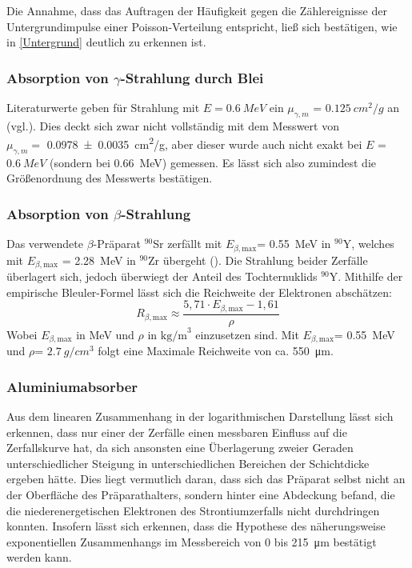 \documentclass[
	a4paper,
	12pt,
	pagesize,
	ngerman
]{scrartcl}
\begin{document}
	Die Annahme, dass das Auftragen der Häufigkeit gegen die Zählereignisse der Untergrundimpulse einer Poisson-Verteilung entspricht, ließ sich bestätigen, wie in \cref{Untergrund} deutlich zu erkennen ist.
	
	\subsubsection{Absorption von $\gamma$-Strahlung durch Blei}
	Literaturwerte geben für Strahlung mit $E=\SI{0,6}{MeV}$ ein $\mu_{\gamma,m}$ = $\SI{0,125}{cm^2/g}$ an (vgl.\cite{absorption_blei}).
	Dies deckt sich zwar nicht vollständig mit dem Messwert von \\
	$\mu_{\gamma,m} = $ \SI{0,0978 \pm 0,0035}{cm^2/g}, 
	aber dieser wurde auch nicht exakt bei $E$ = $\SI{0,6}{MeV}$ (sondern bei \SI{0,66}{MeV}) gemessen.
	Es lässt sich also zumindest die Größenordnung des Messwerts bestätigen.
	
	\subsubsection{Absorption von $\beta$-Strahlung}
	Das verwendete $\beta$-Präparat $^{90}$Sr zerfällt mit $E_{\beta,\text{max}}$= \SI{0,55}{MeV} in $^{90}$Y, welches mit $E_{\beta,\text{max}}$ = \SI{2,28}{MeV} in $^{90}$Zr übergeht (\cite{Einfuehrung}).
	Die Strahlung beider Zerfälle überlagert sich, jedoch überwiegt der Anteil des Tochternuklids $^{90}$Y. 
	Mithilfe der empirische Bleuler-Formel lässt sich die Reichweite der Elektronen abschätzen:
	\begin{equation}
	R_{\beta,\text{max}} \approx \frac{5,71 \cdot E_{\beta,\text{max}} - 1,61}{\rho}
	\label{Bleuler}
	\end{equation} %
	Wobei $E_{\beta,\text{max}}$ in MeV und $\rho$ in $\text{kg/m}^3$ einzusetzen sind.
	Mit $E_{\beta,\text{max}}$= \SI{0,55}{MeV} und $\rho$= $\SI{2,7}{g/cm^3}$ folgt eine Maximale Reichweite von ca. \SI{550}{\micro\meter}.
	
	\subsubsection*{Aluminiumabsorber}
	Aus dem linearen Zusammenhang in der logarithmischen Darstellung lässt sich erkennen, dass nur einer der Zerfälle einen messbaren Einfluss auf die Zerfallskurve hat, da sich ansonsten eine Überlagerung zweier Geraden unterschiedlicher Steigung in unterschiedlichen Bereichen der Schichtdicke ergeben hätte.
	Dies liegt vermutlich daran, dass sich das Präparat selbst nicht an der Oberfläche des Präparathalters, sondern hinter eine Abdeckung befand, die die niederenergetischen Elektronen des Strontiumzerfalls nicht durchdringen konnten.
	Insofern lässt sich erkennen, dass die Hypothese des näherungsweise exponentiellen Zusammenhangs im Messbereich von 0 bis \SI{215}{\micro \meter} bestätigt werden kann.
	
\end{document}

